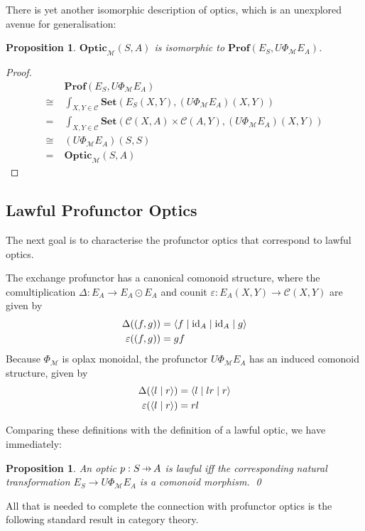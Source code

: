 \documentclass[11pt,letterpaper]{article}
\theoremstyle{plain}
\newtheorem{proposition}[theorem]{Proposition}
\theoremstyle{definition}
\newcommand{\C}{\mathscr{C}}
\newcommand{\M}{\mathscr{M}}
\newcommand{\Pastro}{\Phi}
\newcommand{\Set}{\mathbf{Set}}
\newcommand{\Prof}{\mathbf{Prof}}
\newcommand{\Optic}{\mathbf{Optic}}
\newcommand{\id}{\mathrm{id}}
\newcommand{\rep}[2]{{\ensuremath \left\langle #1 \mid #2 \right\rangle}}
\newcommand{\repthree}[3]{{\ensuremath \langle #1 \mid #2 \mid #3 \rangle}}
\newcommand{\repfour}[4]{{\ensuremath \langle #1 \mid #2 \mid #3 \mid #4 \rangle}}
\newcommand{\hto}{\ensuremath{\,\mathaccent\shortmid\rightarrow\,}}
\begin{document}
There is yet another isomorphic description of optics, which is an unexplored avenue for generalisation:

\begin{proposition}
  $\Optic_\M(S, A)$ is isomorphic to $\Prof(E_S, U \Phi_\M E_A)$.
\end{proposition}
\begin{proof}
  \begin{align*}
    &\Prof(E_S, U \Phi_\M E_A) \\
    \cong\;&\int_{X,Y \in \C} \Set(E_S(X,Y), (U \Phi_\M E_A)(X,Y)) \\
    = \;&\int_{X,Y \in \C} \Set(\C(X,A) \times \C(A,Y), (U \Phi_\M E_A)(X,Y)) \\
    \cong \;& (U \Phi_\M E_A)(S,S) \\
    = \;&\Optic_\M(S, A)
  \end{align*}
\end{proof}

\subsection{Lawful Profunctor Optics}

The next goal is to characterise the profunctor optics that correspond to lawful optics.

The exchange profunctor has a canonical comonoid structure, where the comultiplication $\Delta : E_A \to E_A \odot E_A$ and counit $\varepsilon : E_A(X, Y) \to \C(X, Y)$ are given by
\begin{align*}
  \Delta((f, g)) &= \repfour{f}{\id_A}{\id_A}{g}  \\
  \varepsilon((f, g)) &= gf
\end{align*}
Because $\Pastro_\M$ is oplax monoidal, the profunctor $U\Pastro_\M E_A$ has an induced comonoid structure, given by
\begin{align*}
  \Delta(\rep{l}{r}) &= \repthree{l}{lr}{r} \\
  \varepsilon(\rep{l}{r}) &= rl
\end{align*}

Comparing these definitions with the definition of a lawful optic, we have immediately:

\begin{proposition}
  An optic $p : S \hto A$ is lawful iff the corresponding natural transformation $E_S \rightarrow U \Phi_\M E_A$ is a comonoid morphism. \qed
\end{proposition}

All that is needed to complete the connection with profunctor optics is the following standard result in category theory.
\end{document}
